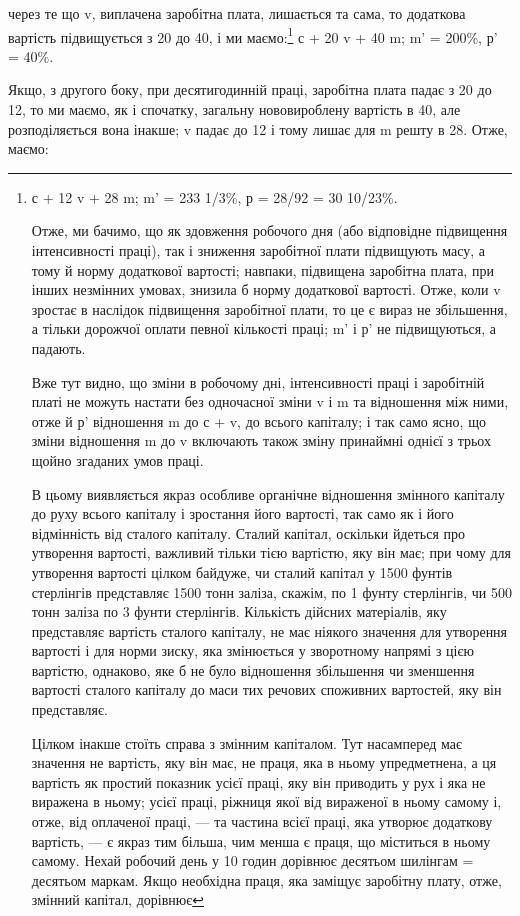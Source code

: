 \parcont{}  %
через те що v, виплачена заробітна плата, лишається та сама,
то додаткова вартість підвищується з 20 до 40, і ми маємо:\footnote{
с + 12 v + 28 m; m' = 233 1/3\%, р = 28/92 = 30 10/23\%.

Отже, ми бачимо, що як здовження робочого дня (або відповідне
підвищення інтенсивності праці), так і зниження заробітної
плати підвищують масу, а тому й норму додаткової вартості;
навпаки, підвищена заробітна плата, при інших незмінних
умовах, знизила б норму додаткової вартості. Отже, коли
v зростає в наслідок підвищення заробітної плати, то це є вираз
не збільшення, а тільки дорожчої оплати певної кількості праці;
m' і р' не підвищуються, а падають.

Вже тут видно, що зміни в робочому дні, інтенсивності
праці і заробітній платі не можуть настати без одночасної зміни
v  і m та відношення між ними, отже й р' відношення m до
с + v, до всього капіталу; і так само ясно, що зміни відношення
m до v включають також зміну принаймні однієї з трьох щойно
згаданих умов праці.

В цьому виявляється якраз особливе органічне відношення
змінного капіталу до руху всього капіталу і зростання його
вартості, так само як і його відмінність від сталого капіталу.
Сталий капітал, оскільки йдеться про утворення вартості, важливий
тільки тією вартістю, яку він має; при чому для утворення
вартості цілком байдуже, чи сталий капітал у 1500 фунтів стерлінгів
представляє 1500 тонн заліза, скажім, по 1 фунту стерлінгів,
чи 500 тонн заліза по 3 фунти стерлінгів. Кількість дійсних
матеріалів, яку представляє вартість сталого капіталу, не має
ніякого значення для утворення вартості і для норми зиску, яка змінюється
у зворотному напрямі з цією вартістю, однаково, яке б
не було відношення збільшення чи зменшення вартості сталого
капіталу до маси тих речових споживних вартостей, яку він
представляє.

Цілком інакше стоїть справа з змінним капіталом. Тут насамперед
має значення не вартість, яку він має, не праця, яка
в ньому упредметнена, а ця вартість як простий показник усієї
праці, яку він приводить у рух і яка не виражена в ньому;
усієї праці, ріжниця якої від вираженої в ньому самому і, отже, від
оплаченої праці, — та частина всієї праці, яка утворює додаткову
вартість, — є якраз тим більша, чим менша є праця, що міститься
в ньому самому. Нехай робочий день у 10 годин дорівнює
десятьом шилінгам = десятьом маркам. Якщо необхідна праця,
яка заміщує заробітну плату, отже, змінний капітал, дорівнює
} с + 20  v + 40 m; m' = 200\%, р' = 40\%.

Якщо, з другого боку, при десятигодинній праці, заробітна
плата падає з 20 до 12, то ми маємо, як і спочатку, загальну
нововироблену вартість в 40, але розподіляється вона інакше;
v падає до 12 і тому лишає для m решту в 28. Отже, маємо:
\parbreak{}  %
